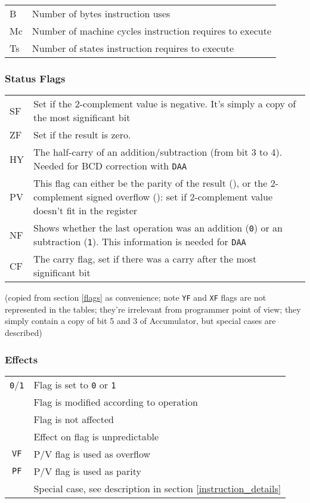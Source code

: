 \documentclass[12pt,twoside,openright,a4paper]{book}
\newcommand{\notet}{\rule{0pt}{2.4ex}}
\begin{document}
\begin{tabular}{ll}
	B & 
		Number of bytes instruction uses \\
	Mc\notet & 
		Number of machine cycles instruction requires to execute \\
	Ts\notet & 
		Number of states instruction requires to execute \\
\end{tabular}

\subsubsection{Status Flags}

\begin{tabular}{lp{13cm}}
	SF & 
		Set if the 2-complement value is negative.  It’s simply a copy of the most significant bit \\
	ZF\notet & 
		Set if the result is zero. \\
	HY\notet & 
		The half-carry of an addition/subtraction (from bit 3 to 4). Needed for BCD correction with {\tt DAA} \\
	PV\notet & 
		This flag can either be the parity of the result ({\tt \FPP}), or the 2-complement signed overflow ({\tt \FPV}): set if 2-complement value doesn’t fit in the register \\
	NF\notet & 
		Shows whether the last operation was an addition ({\tt 0}) or an subtraction  ({\tt 1}). This information is needed for {\tt DAA} \\
	CF\notet & 
		The carry flag, set if there was a carry after the most significant bit \\
\end{tabular}

(copied from section \ref{flags} as convenience; note {\tt YF} and {\tt XF} flags are not represented in the tables; they're irrelevant from programmer point of view; they simply contain a copy of bit 5 and 3 of Accumulator, but special cases are described)

\subsubsection{Effects}

\begin{tabular}{cl}
	{\tt 0}/{\tt 1} & Flag is set to {\tt 0} or {\tt 1} \\
	{\tt \FS} & Flag is modified according to operation \\
	{\tt \FN} & Flag is not affected \\
	{\tt \FU} & Effect on flag is unpredictable \\
	{\tt VF} & P/V flag is used as overflow \\
	{\tt PF} & P/V flag is used as parity \\
	{\tt \FX} & Special case, see description in section \ref{instruction_details}
\end{tabular}
\end{document}
